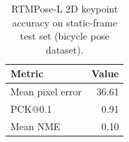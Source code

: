 \begin{table}[t]
\centering
\caption{RTMPose-L 2D keypoint accuracy on static-frame test set (bicycle pose dataset).}
\begin{tabular}{lr}
\toprule
Metric & Value \\
\midrule
Mean pixel error & 36.61 \\
PCK@0.1 & 0.91 \\
Mean NME & 0.10 \\
\bottomrule
\end{tabular}
\end{table}